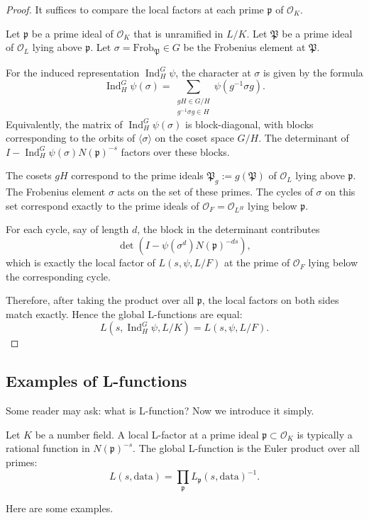 \begin{proof}
It suffices to compare the local factors at each prime \(\mathfrak{p}\) of \(\mathcal{O}_K\).


Let \(\mathfrak{p}\) be a prime ideal of \(\mathcal{O}_K\) that is unramified in \(L/K\). Let \(\mathfrak{P}\) be a prime ideal of \(\mathcal{O}_L\) lying above \(\mathfrak{p}\). Let \(\sigma = \mathrm{Frob}_{\mathfrak{P}} \in G\) be the Frobenius element at \(\mathfrak{P}\).


For the induced representation \(\operatorname{Ind}_{H}^{G} \psi\), the character at \(\sigma\) is given by the formula
\[
\operatorname{Ind}_{H}^{G} \psi(\sigma) = \sum_{\substack{gH \in G/H \\ g^{-1}\sigma g \in H}} \psi(g^{-1}\sigma g).
\]
Equivalently, the matrix of \(\operatorname{Ind}_{H}^{G} \psi(\sigma)\) is block-diagonal, with blocks corresponding to the orbits of \(\langle \sigma \rangle\) on the coset space \(G/H\). The determinant of \(I - \operatorname{Ind}_{H}^{G} \psi(\sigma) N(\mathfrak{p})^{-s}\) factors over these blocks.

The cosets \(gH\) correspond to the prime ideals \(\mathfrak{P}_g := g(\mathfrak{P})\) of \(\mathcal{O}_L\) lying above \(\mathfrak{p}\). The Frobenius element \(\sigma\) acts on the set of these primes. The cycles of \(\sigma\) on this set correspond exactly to the prime ideals of \(\mathcal{O}_F = \mathcal{O}_{L^H}\) lying below \(\mathfrak{p}\).

For each cycle, say of length \(d\), the block in the determinant contributes
\[
\det\!\left( I - \psi(\sigma^d) N(\mathfrak{p})^{-ds} \right),
\]
which is exactly the local factor of \(L(s, \psi, L/F)\) at the prime of \(\mathcal{O}_F\) lying below the corresponding cycle.


Therefore, after taking the product over all \(\mathfrak{p}\), the local factors on both sides match exactly. Hence the global L-functions are equal:
\[
L(s, \operatorname{Ind}_{H}^{G} \psi, L/K) = L(s, \psi, L/F).
\]
\end{proof}



\subsection{Examples of L-functions}
Some reader may ask: what is L-function? Now we introduce it simply.
\begin{defn}
Let \(K\) be a number field. A local L-factor at a prime ideal \(\mathfrak{p} \subset \mathcal{O}_K\) is typically a rational function in \(N(\mathfrak{p})^{-s}\). The global L-function is the Euler product over all primes:
\[
L(s, \text{data}) = \prod_{\mathfrak{p}} L_{\mathfrak{p}}(s, \text{data})^{-1}.
\]
\end{defn}
Here are some examples.

